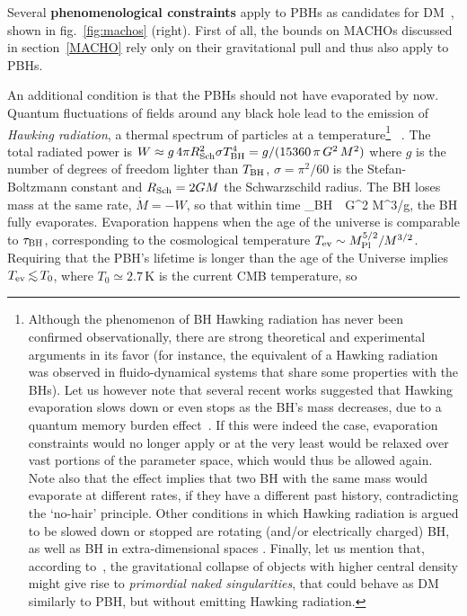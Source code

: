 \medskip
Several {\bf phenomenological constraints} apply to PBHs as candidates for DM~\cite{PBHconstraints}, shown in fig.~\ref{fig:machos} (right). First of all, the bounds on MACHOs discussed in section~\ref{MACHO} rely only on their gravitational pull and thus also apply to PBHs.
 
An additional condition is that the PBHs should not have evaporated by now. Quantum fluctuations of fields around any black hole lead to the emission of {\em Hawking radiation}, a thermal spectrum of particles at a temperature\footnote{Although the phenomenon of BH Hawking radiation has never been confirmed observationally, there are strong theoretical and experimental arguments in its favor (for instance, the equivalent of a Hawking radiation was observed in fluido-dynamical systems that share some properties with the BHs). 
Let us however note that several recent works 
suggested that Hawking evaporation slows down or even stops as the BH's mass decreases, due to a quantum memory burden effect~\cite{memoryburden}. 
If this were indeed the case, evaporation constraints would no longer apply or at the very least would be relaxed over vast portions of the parameter space, which would thus be allowed again. Note also that the effect implies that two BH with the same mass would evaporate at different rates, if they have a different past history, contradicting the `no-hair' principle.
Other conditions in which Hawking radiation is argued to be slowed down or stopped are rotating (and/or electrically charged) BH, as well as BH in extra-dimensional spaces \cite{noHawkingRad}.
Finally, let us mention that, according to~\cite{2401.14431}, the gravitational collapse of objects with higher central density might give rise to
{\em primordial naked singularities}, that could behave as DM similarly to PBH, but without emitting Hawking radiation.}
\beq {}~.\eeq
The total radiated power is  $W \approx g\, 4\pi R_{\rm Sch}^2 \sigma T_{\rm BH}^4=g/(15360\, \pi\, G^2 \, M^2)$
where $g$ is the number of degrees of freedom lighter than $T_{\rm BH}$,
$\sigma=\pi^2/60$ is the  Stefan-Boltzmann constant and $R_{\rm Sch}=2GM$ the Schwarzschild radius.
The BH loses mass at the same rate, $\dot M = - W$, so that within time 
\beq \tau_{\rm BH} \,\pi \, G^2  M^3/g,\eeq
the BH fully evaporates. 
Evaporation happens when the age of the universe is comparable to $\tau_{\rm BH}$,
corresponding to the cosmological temperature $T_{\rm ev} \sim M_{\rm Pl} ^{5/2}/M^{3/2}$.
Requiring that the PBH's lifetime is longer than the age of the Universe implies $T_{\rm ev}\circa{<} T_0$, where $T_0\simeq 2.7\,$K is the current CMB temperature, so
